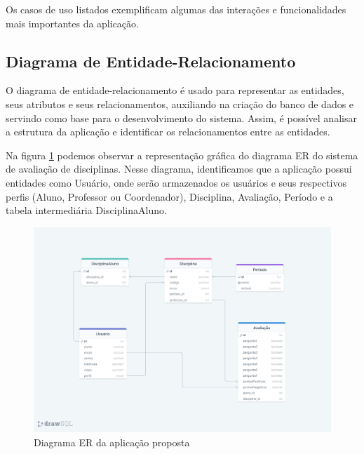 Os casos de uso listados exemplificam algumas das interações e funcionalidades mais importantes da aplicação.

\subsection{Diagrama de Entidade-Relacionamento}

O diagrama de entidade-relacionamento é usado para representar as entidades, seus atributos e seus relacionamentos, auxiliando na criação do banco de dados e servindo como base para o desenvolvimento do sistema. Assim, é possível analisar a estrutura da aplicação e identificar os relacionamentos entre as entidades.

Na figura \ref{fig:fig_diagrama_er} podemos observar a representação gráfica do diagrama ER do sistema de avaliação de disciplinas. Nesse diagrama, identificamos que a aplicação possui entidades como Usuário, onde serão armazenados os usuários e seus respectivos perfis (Aluno, Professor ou Coordenador), Disciplina, Avaliação, Período e a tabela intermediária DisciplinaAluno. 

\begin{figure}[h]
  \centering
  \includegraphics[width=1\textwidth]{imagens/diagrama-er.png}
  \caption{Diagrama ER da aplicação proposta}
  \label{fig:fig_diagrama_er}
\end{figure}


%
%
%



